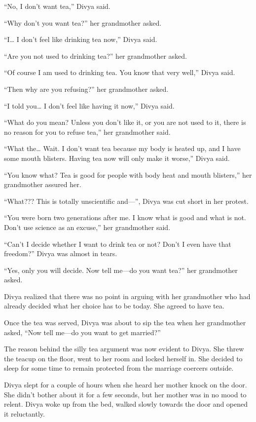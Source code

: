 “No, I don't want tea,” Divya said.

“Why don't you want tea?” her grandmother asked.

“I… I don't feel like drinking tea now,” Divya said.

“Are you not used to drinking tea?” her grandmother asked.

“Of course I am used to drinking tea. You know that very well,” Divya said.

“Then why are you refusing?” her grandmother asked.

“I told you… I don't feel like having it now,” Divya said.

“What do you mean? Unless you don't like it, or you are not used to it, there is
no reason for you to refuse tea,” her grandmother said.

“What the… Wait. I don't want tea because my body is heated up, and I have
some mouth blisters. Having tea now will only make it worse,” Divya said.

“You know what? Tea is good for people with body heat and mouth blisters,” her
grandmother assured her.

“What??? This is totally unscientific and—”, Divya was cut short in her protest.

“You were born two generations after me. I know what is good and what is not.
Don't use science as an excuse,” her grandmother said.

“Can't I decide whether I want to drink tea or not? Don't I even have that
freedom?” Divya was almost in tears.

“Yes, only you will decide. Now tell me—do you want tea?” her grandmother
asked. 

Divya realized that there was no point in arguing with her grandmother who had
already decided what her choice has to be today. She agreed to have tea.

Once the tea was served, Divya was about to sip the tea when her
grandmother asked, “Now tell me—do you want to get married?”

The reason behind the silly tea argument was now evident to Divya. She threw the
teacup on the floor, went to her room and locked herself in. She decided to sleep
for some time to remain protected from the marriage coercers outside.

Divya slept for a couple of hours when she heard her mother knock on the
door. She didn't bother about it for a few seconds, but her mother was in no mood
to relent. Divya woke up from the bed, walked slowly towards the door and opened
it reluctantly.

